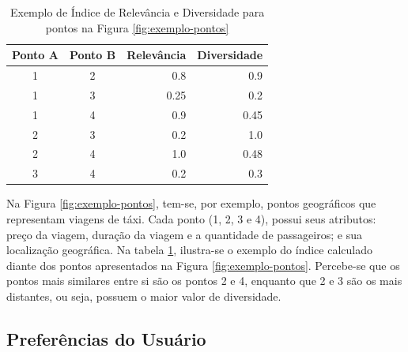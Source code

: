 \begin{table}[!h]
	\caption{Exemplo de Índice de Relevância e Diversidade para pontos na Figura \ref{fig:exemplo-pontos}}
	\label{table:exemplo-indice}
	\centering
	\begin{tabular}{|c|c|r|r|}
	\hline
	\multicolumn{1}{|c|}{\textbf{Ponto A}} & \multicolumn{1}{c|}{\textbf{Ponto B}} & \multicolumn{1}{c|}{\textbf{Relevância}} & \multicolumn{1}{c|}{\textbf{Diversidade}} \\ \hline
	1                                      & 2                                     & 0.8                                      & 0.9                                       \\ \hline
	1                                      & 3                                     & 0.25                                     & 0.2                                       \\ \hline
	1                                      & 4                                     & 0.9                                      & 0.45                                      \\ \hline
	2                                      & 3                                     & 0.2                                      & 1.0                                       \\ \hline
	2                                      & 4                                     & 1.0                                      & 0.48                                      \\ \hline
	3                                      & 4                                     & 0.2                                      & 0.3                                       \\ \hline
	\end{tabular}
	\mfonte
\end{table}

Na Figura \ref{fig:exemplo-pontos}, tem-se, por exemplo, pontos geográficos que representam viagens de táxi. Cada ponto (1, 2, 3 e 4), possui seus atributos: preço da viagem, duração da viagem e a quantidade de passageiros; e sua localização geográfica. Na tabela \ref{table:exemplo-indice}, ilustra-se o exemplo do índice calculado diante dos pontos apresentados na Figura \ref{fig:exemplo-pontos}. Percebe-se que os pontos mais similares entre si são os pontos 2 e 4, enquanto que 2 e 3 são os mais distantes, ou seja, possuem o maior valor de diversidade.


\subsection{Preferências do Usuário}

